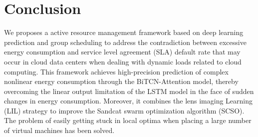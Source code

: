 \documentclass[conference]{{IEEEtran}}
\begin{document}
%



\section{Conclusion}

We proposes a  active resource management framework based on deep learning prediction and group scheduling to address the contradiction between excessive energy consumption and service level agreement (SLA) default rate that may occur in cloud data centers when dealing with dynamic loads related to cloud computing. This framework achieves high-precision prediction of complex nonlinear energy consumption through the BiTCN-Attention  model, thereby overcoming the linear output limitation of the LSTM model in the face of sudden changes in energy consumption. Moreover, it combines the lens imaging Learning (LIL) strategy to improve the Sandcat swarm optimization algorithm (SCSO). The problem of easily getting stuck in local optima when placing a large number of virtual machines has been solved.
\end{document}
